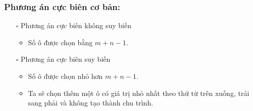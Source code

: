 \documentclass{article}
\begin{document}
\subsubsection{Phương án cực biên cơ bản:}
\begin{itemize}
    \item [$\square$] Phương án cực biên không suy biến
    \begin{itemize}[label=\textbullet]
        \item Số ô được chọn bằng $m+n-1$.
    \end{itemize}
    \item [$\square$] Phương án cực biên suy biến
    \begin{itemize}[label=\textbullet]
        \item Số ô được chọn nhỏ hơn $m+n-1$.
        \item Ta sẽ chọn thêm một ô có giá trị nhỏ nhất theo thứ từ trên xuống, trái sang phải và không tạo thành chu trình.
    \end{itemize}
\end{itemize}
\end{document}
